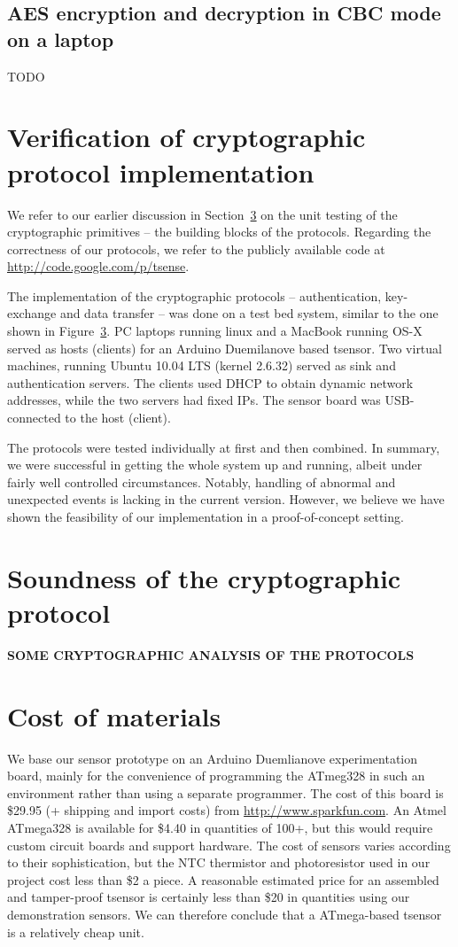 \subsection{AES encryption and decryption in CBC mode on a laptop}

TODO


\section{Verification of cryptographic protocol implementation}

We refer to our earlier discussion in Section~\ref{} on the unit testing of the cryptographic primitives -- the building blocks of the protocols. Regarding the correctness of our protocols, we refer to the publicly available code at \url{http://code.google.com/p/tsense}.

The implementation of the cryptographic protocols -- authentication, key-exchange and data transfer -- was done on a test bed system, similar to the one shown in Figure~\ref{}. PC laptops running linux and a MacBook running OS-X served as hosts (clients) for an Arduino Duemilanove based tsensor. Two virtual machines, running Ubuntu 10.04 LTS (kernel 2.6.32) served as sink and authentication servers. The clients used DHCP to obtain dynamic network addresses, while the two servers had fixed IPs. The sensor board was USB-connected to the host (client).

The protocols were tested individually at first and then combined. In summary, we were successful in getting the whole system up and running, albeit under fairly well controlled circumstances. Notably, handling of abnormal and unexpected events is lacking in the current version. However, we believe we have shown the feasibility of our implementation in a proof-of-concept setting.

\section{Soundness of the cryptographic protocol}

\textbf{SOME CRYPTOGRAPHIC ANALYSIS OF THE PROTOCOLS}

\section{Cost of materials}

We base our sensor prototype on an Arduino Duemlianove experimentation board, mainly for the convenience of programming the ATmeg328 in such an environment rather than using a separate programmer. The cost of this board is \$29.95 (+ shipping and import costs) from \url{http://www.sparkfun.com}. An Atmel ATmega328 is available for \$4.40 in quantities of 100+, but this would require custom circuit boards and support hardware. The cost of sensors varies according to their sophistication, but the NTC thermistor and photoresistor used in our project cost less than \$2 a piece. A reasonable estimated price for an assembled and tamper-proof tsensor is certainly less than \$20 in quantities using our demonstration sensors. We can therefore conclude that a ATmega-based tsensor is a relatively cheap unit.

